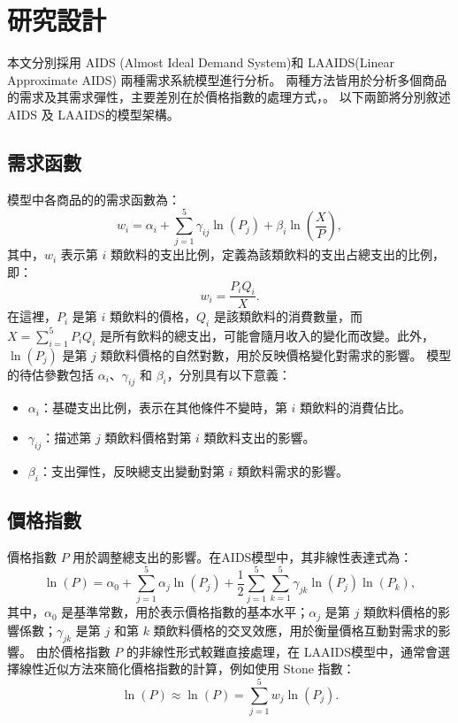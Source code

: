 \section{研究設計}

本文分別採用 AIDS (Almost Ideal Demand System)和 LAAIDS(Linear Approximate AIDS) 兩種需求系統模型進行分析。
兩種方法皆用於分析多個商品的需求及其需求彈性，主要差別在於價格指數的處理方式，。
以下兩節將分別敘述 AIDS 及 LAAIDS的模型架構。

\subsection*{需求函數}
 模型中各商品的的需求函數為：
\begin{equation}
w_i = \alpha_i + \sum_{j=1}^{5} \gamma_{ij} \ln(P_j) + \beta_i \ln\left(\frac{X}{P}\right),
\end{equation}
其中，\(w_i\) 表示第 \(i\) 類飲料的支出比例，定義為該類飲料的支出占總支出的比例，即：
\begin{equation}
w_i = \frac{P_i Q_i}{X}.
\end{equation}
在這裡，\(P_i\) 是第 \(i\) 類飲料的價格，\(Q_i\) 是該類飲料的消費數量，而 \(X = \sum_{i=1}^5 P_i Q_i\) 是所有飲料的總支出，可能會隨月收入的變化而改變。此外，\(\ln(P_j)\) 是第 \(j\) 類飲料價格的自然對數，用於反映價格變化對需求的影響。
模型的待估參數包括 \(\alpha_i\)、\(\gamma_{ij}\) 和 \(\beta_i\)，分別具有以下意義：
\begin{itemize}
    \item \(\alpha_i\)：基礎支出比例，表示在其他條件不變時，第 \(i\) 類飲料的消費佔比。
    \item \(\gamma_{ij}\)：描述第 \(j\) 類飲料價格對第 \(i\) 類飲料支出的影響。
    \item \(\beta_i\)：支出彈性，反映總支出變動對第 \(i\) 類飲料需求的影響。
\end{itemize}


\subsection*{價格指數}
價格指數 \(P\) 用於調整總支出的影響。在AIDS模型中，其非線性表達式為：
\begin{equation}
\ln(P) = \alpha_0 + \sum_{j=1}^{5} \alpha_j \ln(P_j) + \frac{1}{2} \sum_{j=1}^{5} \sum_{k=1}^{5} \gamma_{jk} \ln(P_j) \ln(P_k),
\end{equation}
其中，\(\alpha_0\) 是基準常數，用於表示價格指數的基本水平；\(\alpha_j\) 是第 \(j\) 類飲料價格的影響係數；\(\gamma_{jk}\) 是第 \(j\) 和第 \(k\) 類飲料價格的交叉效應，用於衡量價格互動對需求的影響。
由於價格指數 \(P\) 的非線性形式較難直接處理，在 LAAIDS模型中，通常會選擇線性近似方法來簡化價格指數的計算，例如使用 Stone 指數：
\begin{equation}
	\ln(P) \approx \ln(P) = \sum_{j=1}^{5} w_j \ln(P_j).
\end{equation}

